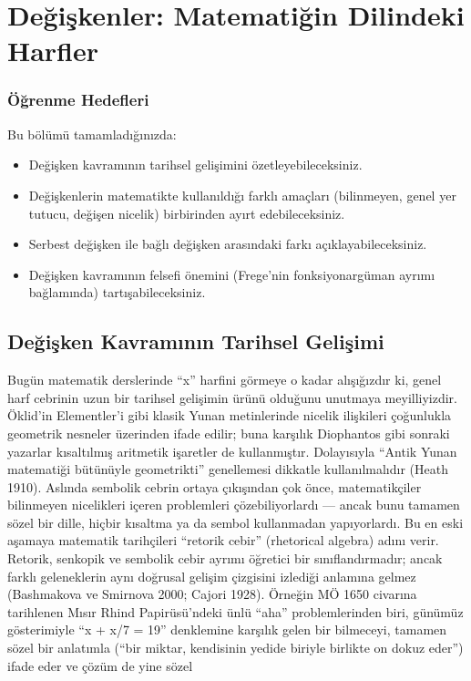 \chapter{Değişkenler: Matematiğin Dilindeki Harfler}
\label{chap:sembolik-mantik}

\subsection*{Öğrenme Hedefleri}

Bu bölümü tamamladığınızda:

\begin{itemize}\setlength{\itemsep}{2pt}\setlength{\parskip}{0pt}
\item Değişken kavramının tarihsel gelişimini özetleyebileceksiniz.
\item Değişkenlerin matematikte kullanıldığı farklı amaçları (bilinmeyen, genel yer tutucu, değişen nicelik) birbirinden ayırt edebileceksiniz.
\item Serbest değişken ile bağlı değişken arasındaki farkı açıklayabileceksiniz.
\item Değişken kavramının felsefi önemini (Frege’nin fonksiyonargüman ayrımı bağlamında) tartışabileceksiniz.
\end{itemize}

\section{Değişken Kavramının Tarihsel Gelişimi}

Bugün matematik derslerinde “x” harfini görmeye o kadar alışığızdır ki, genel harf cebrinin uzun bir tarihsel gelişimin ürünü olduğunu unutmaya meyilliyizdir. Öklid’in Elementler’i gibi klasik Yunan metinlerinde nicelik ilişkileri çoğunlukla geometrik nesneler üzerinden ifade edilir; buna karşılık Diophantos gibi sonraki yazarlar kısaltılmış aritmetik işaretler de kullanmıştır. Dolayısıyla “Antik Yunan matematiği bütünüyle geometrikti” genellemesi dikkatle kullanılmalıdır (Heath 1910). Aslında sembolik cebrin ortaya çıkışından çok önce, matematikçiler bilinmeyen nicelikleri içeren problemleri çözebiliyorlardı — ancak bunu tamamen sözel bir dille, hiçbir kısaltma ya da sembol kullanmadan yapıyorlardı. Bu en eski aşamaya matematik tarihçileri “retorik cebir” (rhetorical algebra) adını verir. Retorik, senkopik ve sembolik cebir ayrımı öğretici bir sınıflandırmadır; ancak farklı geleneklerin aynı doğrusal gelişim çizgisini izlediği anlamına gelmez (Bashmakova ve Smirnova 2000; Cajori 1928). Örneğin MÖ 1650 civarına tarihlenen Mısır Rhind Papirüsü’ndeki ünlü “aha” problemlerinden biri, günümüz gösterimiyle “x + x/7 = 19” denklemine karşılık gelen bir bilmeceyi, tamamen sözel bir anlatımla (“bir miktar, kendisinin yedide biriyle birlikte on dokuz eder”) ifade eder ve çözüm de yine sözel

